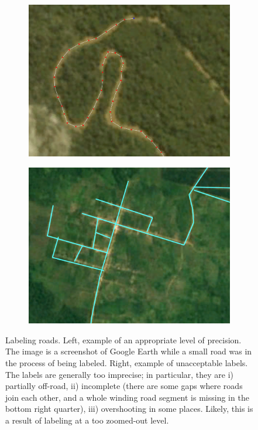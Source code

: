 \documentclass[12pt,a4paper]{scrartcl}
\begin{document}
\begin{figure}
	\begin{subfigure}{0.48\textwidth}
		\includegraphics[width=0.957\linewidth]{GE_example_clickclick01_exc.png}
		\label{fig:goodlabel}
	\end{subfigure} 
	\begin{subfigure}{0.48\textwidth}
		\includegraphics[width=0.957\linewidth]{GE_exemplaryScene_Borneo_allRoads_exc.png}
		\label{fig:badlabel}
	\end{subfigure} 
	\caption{Labeling roads. Left, example of an appropriate level of precision. The image is a screenshot of Google Earth while a small road was in the process of being labeled. Right, example of unacceptable labels. The labels are generally too imprecise; in particular, they are i) partially off-road, ii) incomplete (there are some gaps where roads join each other, and a whole winding road segment is missing in the bottom right quarter), iii) overshooting in some places. Likely, this is a result of labeling at a too zoomed-out level.}
	\label{fig:label_examples}
\end{figure}
\end{document}
